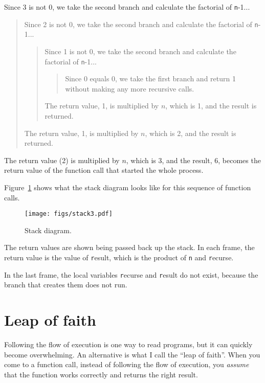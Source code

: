 \documentclass[
DIV=11,
fontsize=13,
twoside,
headinclude=false,
titlepage=firstiscover,
abstract=true,
headsepline=true,
footsepline=true,
chapterprefix=true, %
headings=big,
bibliography=totoc,%
captions=tableheading
]{scrbook}
\theoremstyle{definition}
\begin{document}
Since 3 is not 0, we take the second branch and calculate the factorial
of {\texttt n-1}...

\begin{quote}
Since 2 is not 0, we take the second branch and calculate the factorial of
{\texttt n-1}...


  \begin{quote}
  Since 1 is not 0, we take the second branch and calculate the factorial
  of {\texttt n-1}...


    \begin{quote}
    Since 0 equals 0, we take the first branch and return 1
    without making any more recursive calls.
    \end{quote}


  The return value, 1, is multiplied by $n$, which is 1, and the
  result is returned.
  \end{quote}


The return value, 1, is multiplied by $n$, which is 2, and the
result is returned.
\end{quote}


The return value (2) is multiplied by $n$, which is 3, and the result, 6,
becomes the return value of the function call that started the whole
process.

Figure~\ref{fig.stack3} shows what the stack diagram looks like for
this sequence of function calls.

\begin{figure}
\centerline
{\texttt{[image: figs/stack3.pdf]}}
\caption{Stack diagram.}
\label{fig.stack3}
\end{figure}

The return values are shown being passed back up the stack.  In each
frame, the return value is the value of {\texttt result}, which is the
product of {\texttt n} and {\texttt recurse}.

In the last frame, the local
variables {\texttt recurse} and {\texttt result} do not exist, because
the branch that creates them does not run.


\section{Leap of faith}

Following the flow of execution is one way to read programs, but
it can quickly become overwhelming.  An
alternative is what I call the ``leap of faith''.  When you come to a
function call, instead of following the flow of execution, you {\em
assume} that the function works correctly and returns the right
result.
\end{document}
